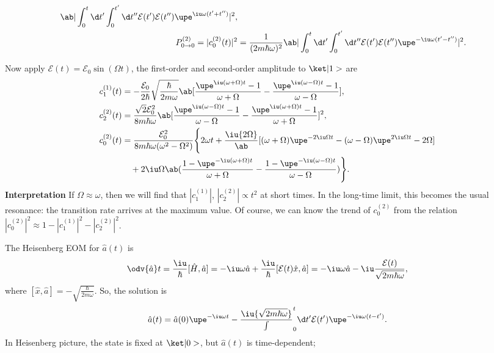 \begin{solution}
\begin{enumext}
\begin{enumext}
\begin{align*}
        \ab|\int_0^t \d t' \int_0^{t'} \d t''
        \mathcal E(t') \mathcal E(t'') \upe^{\iu\omega(t'+t'')}|^2,\\
        P_{0\to0}^{(2)} = |c_0^{(2)}(t)|^2 & = \frac1{(2m\hbar\omega)^2}
        \ab|\int_0^t \d t' \int_0^{t'} \d t''
        \mathcal E(t') \mathcal E(t'') \upe^{-\iu\omega(t'-t'')}|^2.
      \end{align*}
    \end{enumext}
    Now apply $\mathcal E(t) = \mathcal E_0 \sin(\Omega t)$, the first-order and second-order amplitude to $\ket|1>$ are
    \begin{align*}
      c_1^{(1)}(t) & = -\frac{\mathcal E_0}{2\hbar} \sqrt{\frac\hbar{2m\omega}}
      \ab[\frac{\upe^{\iu(\omega+\Omega)t} - 1}{\omega + \Omega} -
          \frac{\upe^{\iu(\omega-\Omega)t} - 1}{\omega - \Omega}],\\
      c_2^{(2)}(t) & = \frac{\sqrt2\mathcal E_0^2}{8m\hbar\omega}
      \ab[\frac{\upe^{\iu(\omega-\Omega)t} - 1}{\omega - \Omega} -
          \frac{\upe^{\iu(\omega+\Omega)t} - 1}{\omega + \Omega}
      ]^2,\\
      c_0^{(2)}(t) & =
      \frac{\mathcal E_0^2}{8m\hbar\omega(\omega^2 - \Omega^2)}\Bigg\{
        2\omega t + \frac\iu{2\Omega}\ab[(\omega + \Omega)\upe^{-2\iu\Omega t}
      - (\omega - \Omega) \upe^{2\iu\Omega t} - 2\Omega]\\
      & \quad + 2\iu\Omega\ab(
        \frac{1 - \upe^{-\iu(\omega+\Omega)t}}{\omega + \Omega} -
        \frac{1 - \upe^{-\iu(\omega-\Omega)t}}{\omega - \Omega})
      \Bigg\}.
    \end{align*}
    \textbf{Interpretation}
    If $\Omega \approx \omega$, then we will find that $|c_1^{(1)}|$, $|c_2^{(2)}| \propto t^2$ at short times.
    In the long-time limit, this becomes the usual resonance: the transition rate arrives at the maximum value.
    Of course, we can know the trend of $c_0^{(2)}$ from the relation $|c_0^{(2)}|^2 \approx 1 - |c_1^{(1)}|^2 - |c_2^{(2)}|^2$.
    \item The Heisenberg EOM for $\hat a(t)$ is
    \[
      \odv{\hat a}t = \frac\iu\hbar [\hat H, \hat a]
    = -\iu\omega\hat a + \frac\iu\hbar[\mathcal E(t)\hat x, \hat a]
    = -\iu\omega\hat a - \iu\frac{\mathcal E(t)}{\sqrt{2m\hbar\omega}},
    \]
    where $[\hat x, \hat a] = -\sqrt{\frac\hbar{2m\omega}}$.
    So, the solution is
    \[
      \hat a(t) = \hat a(0) \upe^{-\iu\omega t}
    - \frac\iu{\sqrt{2m\hbar\omega}} \int_0^t \d t' \mathcal E(t') \upe^{-\iu\omega(t-t')}.
    \]
    In Heisenberg picture, the state is fixed at $\ket|0>$, but $\hat a(t)$ is time-dependent;

\end{enumext}
\end{solution}
